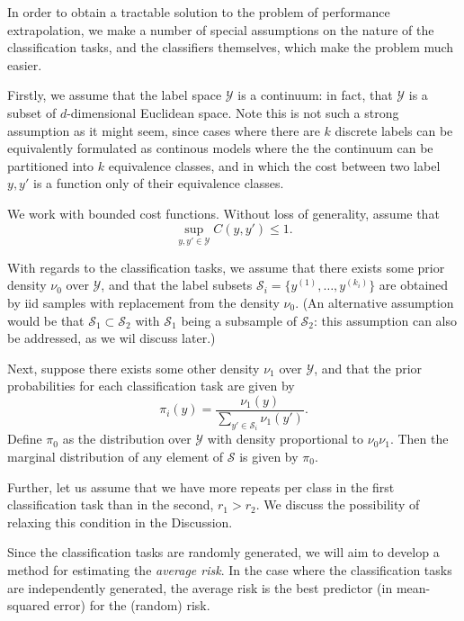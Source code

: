 \documentclass[12pt]{article}
\begin{document}
In order to obtain a tractable solution to the problem of performance
extrapolation, we make a number of special assumptions on the nature
of the classification tasks, and the classifiers themselves, which
make the problem much easier.

Firstly, we assume that the label space $\mathcal{Y}$ is a continuum:
in fact, that $\mathcal{Y}$ is a subset of $d$-dimensional Euclidean
space. Note this is not such a strong assumption as it might seem,
since cases where there are $k$ discrete labels can be equivalently
formulated as continous models where the the continuum can be
partitioned into $k$ equivalence classes, and in which the cost
between two label $y, y'$ is a function only of their equivalence
classes.

We work with bounded cost functions.  Without loss of generality,
assume that
\[
\sup_{y, y'\in \mathcal{Y}} C(y, y') \leq 1.
\]

With regards to the classification tasks, we assume that there exists
some prior density $\nu_0$ over $\mathcal{Y}$,
and that the label subsets $\mathcal{S}_i = \{y^{(1)}, \hdots,
y^{(k_i)}\}$ are obtained by iid samples with replacement from the density $\nu_0$.
(An alternative assumption would be that $\mathcal{S}_1 \subset
\mathcal{S}_2$ with $\mathcal{S}_1$ being a subsample of
$\mathcal{S}_2$: this assumption can also be addressed, as we wil
discuss later.)

Next, suppose there exists some other density $\nu_1$ over
$\mathcal{Y}$, and that the prior probabilities for each
classification task are given by
\[
\pi_i(y) = \frac{\nu_1(y)}{\sum_{y' \in \mathcal{S}_i} \nu_1(y')}.
\]
Define $\pi_0$ as the distribution over $\mathcal{Y}$ with density
proportional to $\nu_0 \nu_1$.  Then the marginal distribution of any
element of $\mathcal{S}$ is given by $\pi_0$.

Further, let us assume that we have more repeats per class in the
first classification task than in the second, $r_1 > r_2$.  We discuss
the possibility of relaxing this condition in the Discussion.

Since the classification tasks are randomly generated, we will aim to
develop a method for estimating the \emph{average risk}.  In the case
where the classification tasks are independently generated, the
average risk is the best predictor (in mean-squared error) for the
(random) risk.
\end{document}
